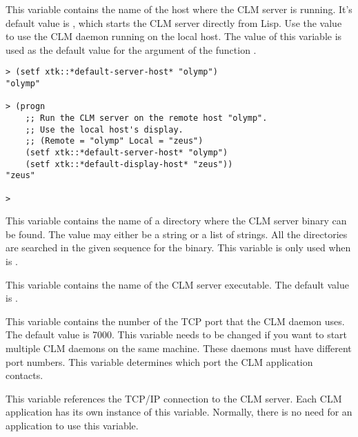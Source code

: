 \begin{lispd}
\beschr This variable contains the name of the host where the CLM server is
running. It's default value is , which starts the CLM server
directly from Lisp. Use the value  to use the CLM daemon
running
on the local host. The value of this variable is used as the default value for
the  argument of the function .

\beispiel 
\begin{verbatim}
> (setf xtk::*default-server-host* "olymp")
"olymp"

> (progn
    ;; Run the CLM server on the remote host "olymp".
    ;; Use the local host's display.
    ;; (Remote = "olymp" Local = "zeus")
    (setf xtk::*default-server-host* "olymp")
    (setf xtk::*default-display-host* "zeus"))
"zeus"

>
\end{verbatim}
\end{lispd}

\begin{lispd}
\beschr This variable contains the name of a directory where the CLM server
binary can be found. The value may either be a string or a list of strings.
All the directories are searched in the given sequence for the binary. This
variable is only used when  is .
\end{lispd}

\begin{lispd}
\beschr This variable contains the name of the CLM server executable. The
default value is .
\end{lispd}

\begin{lispd}
\beschr This variable contains the number of the TCP port that the CLM
daemon uses. The default value is 7000. This variable needs to be changed
if you want to start multiple CLM daemons on the same machine. These daemons
must have different port numbers. This variable determines which port the
CLM application contacts. 
\end{lispd}

\begin{lispd}
\beschr This variable references the TCP/IP connection to the CLM server. 
Each CLM application has its own instance of this variable.  Normally, there is
no need for an application to use this variable. 
\end{lispd}
\pagebreak

